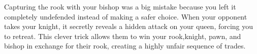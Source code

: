 Capturing the rook with your bishop was a big mistake because you left it completely undefended instead of making a safer choice. When your opponent takes your knight, it secretly reveals a hidden attack on your queen, forcing you to retreat. This clever trick allows them to win your rook,knight, pawn, and bishop in exchange for their rook, creating a highly unfair sequence of trades.